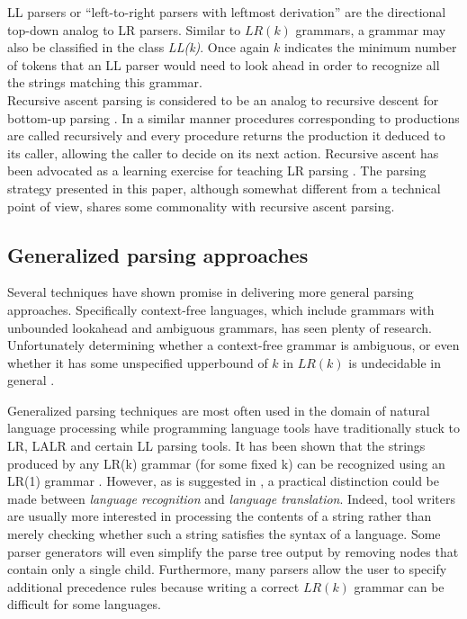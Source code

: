\documentclass[a4paper,11pt]{article}
\begin{document}
LL parsers or ``left-to-right parsers with leftmost derivation'' are the directional top-down analog to LR parsers.
Similar to $LR(k)$ grammars, a grammar may also be classified in the class \emph{LL(k)}.
Once again $k$ indicates the minimum number of tokens that an LL parser would need to look ahead in order to recognize all the strings matching this grammar.\\

Recursive ascent parsing is considered to be an analog to recursive descent for bottom-up parsing \cite{47909}.
In a similar manner procedures corresponding to productions are called recursively and every procedure returns the production it deduced to its caller, allowing the caller to decide on its next action.
Recursive ascent has been advocated as a learning exercise for teaching LR parsing \cite{770849}.
The parsing strategy presented in this paper, although somewhat different from a technical point of view, shares some commonality with recursive ascent parsing.

\subsection{Generalized parsing approaches}

Several techniques have shown promise in delivering more general parsing approaches.
Specifically context-free languages, which include grammars with unbounded lookahead and ambiguous grammars, has seen plenty of research.
Unfortunately determining whether a context-free grammar is ambiguous, or even whether it has some unspecified upperbound of $k$ in $LR(k)$ is undecidable in general \cite{knuth65}.

Generalized parsing techniques are most often used in the domain of natural language processing while programming language tools have traditionally stuck to LR, LALR and certain LL parsing tools.
It has been shown that the strings produced by any LR(k) grammar (for some fixed k) can be recognized using an LR(1) grammar \cite{knuth65}.
However, as is suggested in \cite{Parr95lland}, a practical distinction could be made between \emph{language recognition} and \emph{language translation}.
Indeed, tool writers are usually more interested in processing the contents of a string rather than merely checking whether such a string satisfies the syntax of a language.
Some parser generators will even simplify the parse tree output by removing nodes that contain only a single child. %
Furthermore, many parsers allow the user to specify additional precedence rules because writing a correct $LR(k)$ grammar can be difficult for some languages.
\end{document}
